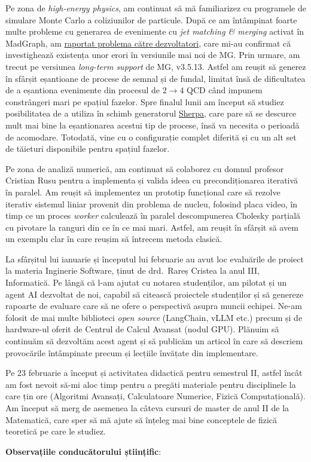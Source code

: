 Pe zona de \textit{high-energy physics}, am continuat să mă familiarizez cu programele de simulare Monte Carlo a coliziunilor de particule. După ce am întâmpinat foarte multe probleme cu generarea de evenimente cu \textit{jet matching \& merging} activat în MadGraph, am \href{https://bugs.launchpad.net/mg5amcnlo/+bug/2141231}{raportat problema către dezvoltatori}, care mi-au confirmat că investighează existența unor erori în versiunile mai noi de MG. Prin urmare, am trecut pe versiunea \textit{long-term support} de MG, v3.5.13. Astfel am reușit să generez în sfârșit eșantioane de procese de semnal și de fundal, limitat însă de dificultatea de a eșantiona evenimente din procesul de \(2 \rightarrow 4\) QCD când impunem constrângeri mari pe spațiul fazelor. Spre finalul lunii am început să studiez posibilitatea de a utiliza în schimb generatorul \href{https://sherpa-team.gitlab.io/}{Sherpa}, care pare să se descurce mult mai bine la eșantionarea acestui tip de procese, însă va necesita o perioadă de acomodare. Totodată, vine cu o configurație complet diferită și cu un alt set de tăieturi disponibile pentru spațiul fazelor.

Pe zona de analiză numerică, am continuat să colaborez cu domnul profesor Cristian Rusu pentru a implementa și valida ideea cu precondiționarea iterativă în paralel. Am reușit să implementez un prototip funcțional care să rezolve iterativ sistemul liniar provenit din problema de nucleu, folosind placa video, în timp ce un proces \textit{worker} calculează în paralel descompunerea Cholesky parțială cu pivotare la ranguri din ce în ce mai mari. Astfel, am reușit în sfârșit să avem un exemplu clar în care reușim să întrecem metoda clasică.

La sfârșitul lui ianuarie și începutul lui februarie au avut loc evaluările de proiect la materia Inginerie Software, ținut de drd.~Rareș Cristea la anul III, Informatică. Pe lângă că l-am ajutat cu notarea studenților, am pilotat și un agent AI dezvoltat de noi, capabil să citească proiectele studenților și să genereze rapoarte de evaluare care să ne ofere o perspectivă asupra muncii echipei. Ne-am folosit de mai multe biblioteci \textit{open source} (LangChain, vLLM etc.) precum și de hardware-ul oferit de Centrul de Calcul Avansat (nodul GPU). Plănuim să continuăm să dezvoltăm acest agent și să publicăm un articol în care să descriem provocările întâmpinate precum și lecțiile învățate din implementare.

Pe 23 februarie a început și activitatea didactică pentru semestrul II, astfel încât am fost nevoit să-mi aloc timp pentru a pregăti materiale pentru disciplinele la care țin ore (Algoritmi Avansați, Calculatoare Numerice, Fizică Computațională). Am început să merg de asemenea la câteva cursuri de master de anul II de la Matematică, care sper să mă ajute să înțeleg mai bine conceptele de fizică teoretică pe care le studiez.

\textbf{Observațiile conducătorului științific}:

